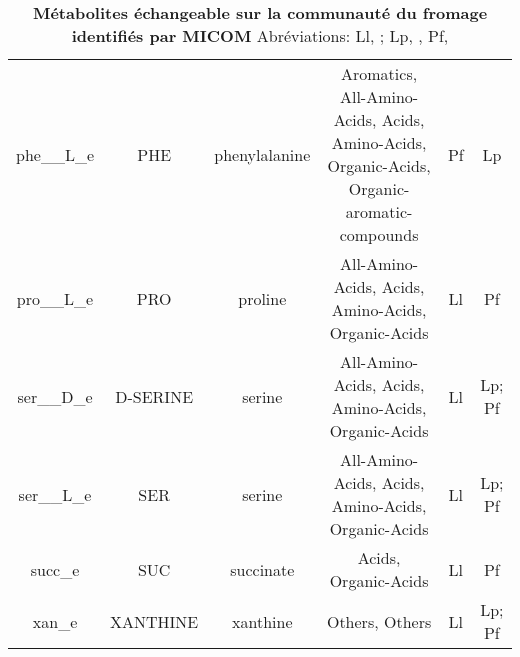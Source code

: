 \begin{table}[H]
\begin{adjustbox}{width=\textwidth}
\begin{tabular}{|c|c|c|c|c|c|}
phe\_\_L\_e &	PHE &	phenylalanine &	Aromatics, All-Amino-Acids, Acids, Amino-Acids, Organic-Acids, Organic-aromatic-compounds &	Pf	& Lp \\
pro\_\_L\_e &	PRO &	proline &	All-Amino-Acids, Acids, Amino-Acids, Organic-Acids &	Ll	& Pf \\
ser\_\_D\_e &	D-SERINE &	serine	& All-Amino-Acids, Acids, Amino-Acids, Organic-Acids &	Ll	& Lp; Pf \\
ser\_\_L\_e &	SER	& serine &	All-Amino-Acids, Acids, Amino-Acids, Organic-Acids &	Ll &	Lp; Pf \\
succ\_e &	SUC	& succinate	& Acids, Organic-Acids &	Ll &	Pf \\
xan\_e &	XANTHINE &	xanthine &	Others, Others &	Ll	& Lp; Pf \\
 \hline
\end{tabular}
\end{adjustbox}
\caption{\textbf{Métabolites échangeable sur la communauté du fromage identifiés par MICOM} Abréviations: Ll, \lactis; Lp, \plantarum, Pf, \freud}
\label{table:exchangeable-metabolites-MICOM}
\end{table}

